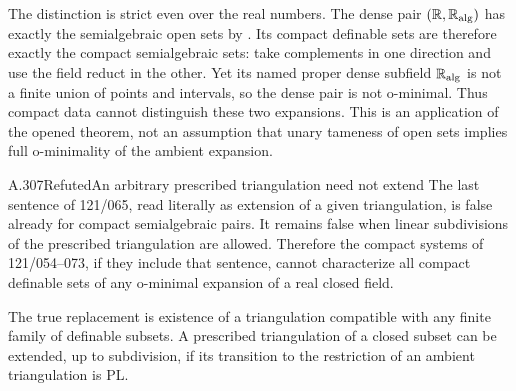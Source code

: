 The distinction is strict even over the real numbers. The dense pair
$(\mathbb R,\mathbb R_{\mathrm{alg}})$ has exactly the semialgebraic open sets by
\cite[Theorem 5 and its proof in \S4.8, pp.~63 and 77;
Corollary 4.9, pp.~77--78]{VandenDriesDensePairs1998}.
Its compact definable sets are therefore exactly the compact
semialgebraic sets: take complements in one direction and use the
field reduct in the other. Yet its named proper dense subfield
$\mathbb R_{\mathrm{alg}}$ is not a finite union of points and intervals, so
the dense pair is not o-minimal. Thus compact data cannot distinguish
these two expansions. This is an application of the opened theorem,
not an assumption that unary tameness of open sets implies full
o-minimality of the ambient expansion.

\begin{saresult}{A.307}{Refuted}{An arbitrary prescribed triangulation need not extend}
The last sentence of 121/065, read literally as extension of a given
triangulation, is false already for compact semialgebraic pairs. It
remains false when linear subdivisions of the prescribed triangulation
are allowed. Therefore the compact systems of 121/054--073, if they
include that sentence, cannot characterize all compact definable sets
of any o-minimal expansion of a real closed field.

The true replacement is existence of a triangulation compatible with
any finite family of definable subsets. A prescribed triangulation of
a closed subset can be extended, up to subdivision, if its transition
to the restriction of an ambient triangulation is PL.
\end{saresult}
